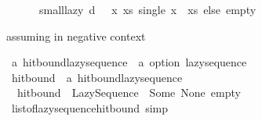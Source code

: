 \begin{isabellebody}
\ \ \ \ \ \ {\isacharparenleft}{\kern0pt}small{\isacharunderscore}{\kern0pt}lazy\ {\isacharparenleft}{\kern0pt}d\ {\isacharminus}{\kern0pt}\ {}{\isacharparenright}{\kern0pt}{\isacharparenright}{\kern0pt}{\isacharparenright}{\kern0pt}\ {\isacharparenleft}{\kern0pt}{\isasymlambda}{\isacharparenleft}{\kern0pt}x{\isacharcomma}{\kern0pt}\ xs{\isacharparenright}{\kern0pt}{\isachardot}{\kern0pt}\ single\ {\isacharparenleft}{\kern0pt}x\ {\isacharhash}{\kern0pt}\ xs{\isacharparenright}{\kern0pt}{\isacharparenright}{\kern0pt}\ else\ empty{\isacharparenright}{\kern0pt}{\isachardoublequoteclose}\isanewline
\isanewline
{}\isamarkupfalse%
%
\isadelimproof
\ %
\endisadelimproof
%
\isatagproof
\isacommand{{\isachardot}{\kern0pt}{\isachardot}{\kern0pt}}\isamarkupfalse%
%
\endisatagproof
{\isafoldproof}%
%
\isadelimproof
%
\endisadelimproof
\isanewline
\isanewline
{}\isamarkupfalse%
%
\isadelimdocument
%
\endisadelimdocument
%
\isatagdocument
%
\isamarkuptrue%
%
\endisatagdocument
{\isafolddocument}%
%
\isadelimdocument
%
\endisadelimdocument
%
\begin{isamarkuptext}%
assuming in negative context%
\end{isamarkuptext}\isamarkuptrue%
\isamarkupfalse%
\ {\isacharprime}{\kern0pt}a\ hit{\isacharunderscore}{\kern0pt}bound{\isacharunderscore}{\kern0pt}lazy{\isacharunderscore}{\kern0pt}sequence\ {\isacharequal}{\kern0pt}\ {\isachardoublequoteopen}{\isacharprime}{\kern0pt}a\ option\ lazy{\isacharunderscore}{\kern0pt}sequence{\isachardoublequoteclose}\isanewline
\isanewline
{}\isamarkupfalse%
\ hit{\isacharunderscore}{\kern0pt}bound\ {\isacharcolon}{\kern0pt}{\isacharcolon}{\kern0pt}\ {\isachardoublequoteopen}{\isacharprime}{\kern0pt}a\ hit{\isacharunderscore}{\kern0pt}bound{\isacharunderscore}{\kern0pt}lazy{\isacharunderscore}{\kern0pt}sequence{\isachardoublequoteclose}\isanewline
{}\isanewline
\ \ {\isachardoublequoteopen}hit{\isacharunderscore}{\kern0pt}bound\ {\isacharequal}{\kern0pt}\ Lazy{\isacharunderscore}{\kern0pt}Sequence\ {\isacharparenleft}{\kern0pt}{\isasymlambda}{\isacharunderscore}{\kern0pt}{\isachardot}{\kern0pt}\ Some\ {\isacharparenleft}{\kern0pt}None{\isacharcomma}{\kern0pt}\ empty{\isacharparenright}{\kern0pt}{\isacharparenright}{\kern0pt}{\isachardoublequoteclose}\isanewline
\isanewline
{}\isamarkupfalse%
\ list{\isacharunderscore}{\kern0pt}of{\isacharunderscore}{\kern0pt}lazy{\isacharunderscore}{\kern0pt}sequence{\isacharunderscore}{\kern0pt}hit{\isacharunderscore}{\kern0pt}bound\ {\isacharbrackleft}{\kern0pt}simp{\isacharbrackright}{\kern0pt}{\isacharcolon}{\kern0pt}\isanewline

\end{isabellebody}
